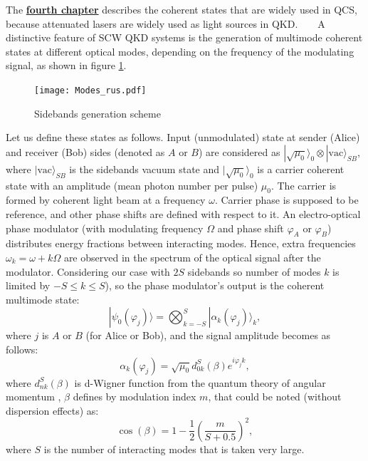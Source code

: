 
 The \underline{\textbf{fourth chapter}} describes the coherent states that are widely used in QCS, because attenuated lasers are widely used as light sources in QKD.
 
  A distinctive feature of SCW QKD systems is the generation of multimode coherent states at different optical modes, depending on the frequency of the modulating signal, as shown in figure \ref{fig:multimodes}. 

 \begin{figure}[ht]
  \centering
  \texttt{[image: Modes\_rus.pdf]}
  \caption{Sidebands generation scheme}
  \label{fig:multimodes}
\end{figure}


Let us define these states as follows. Input (unmodulated) state at sender (Alice) and receiver (Bob) sides (denoted as $A$ or $B$) are considered as $|\sqrt{\mu_0}\rangle_0\otimes|\mathrm{vac}\rangle_{SB}$, where $|\mathrm{vac}\rangle_{SB}$ is the sidebands vacuum state and $|\sqrt{\mu_0}\rangle_0$ is a carrier coherent state with an amplitude (mean photon number per pulse) $\mu_0$. The carrier is formed by coherent light beam at a frequency $\omega$. Carrier phase is supposed to be reference, and other phase shifts are defined with respect to it. An electro-optical phase modulator (with modulating frequency $\Omega$ and phase shift $\varphi_A$ or $\varphi_B$) distributes energy fractions between interacting modes. Hence, extra frequencies $\omega_k=\omega+k\Omega$ are observed in the spectrum of the optical signal after the modulator. Considering our case with $2S$ sidebands so number of modes $k$ is limited by $-S\le k\le S$), so the phase modulator's output is the coherent multimode state: 
%
\begin{equation}\label{phi}
|\psi_0(\varphi_j)\rangle = \bigotimes_{k=-S}^S|{\alpha_k(\varphi_j)}\rangle_k,
\end{equation}
%
where $j$ is  $A$ or $B$ (for Alice or Bob), and the signal amplitude becomes as follows: 
%
\begin{equation}\label{alpha}
\alpha_k(\varphi_j)=\sqrt{\mu_0}d^S_{0k}(\beta)e^{i\varphi_jk},
\end{equation}
%
where $d^S_{nk}(\beta)$ is d-Wigner function from the quantum theory of angular momentum  %
, $\beta$ defines by modulation index $m$, that could be noted (without dispersion effects) as: 
%
\begin{equation}\label{betam}
\cos{({\beta})}=1-\frac{1}{2}{\left(\frac{m}{S+0.5}\right)^2},
\end{equation}
where $S$ is the number of interacting modes that is taken very large.

